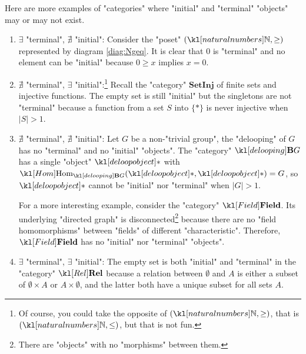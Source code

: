 \documentclass[main.tex]{subfiles}
\begin{document}
\begin{exmps}
	Here are more examples of "categories" where "initial" and "terminal" "objects" may or may not exist.
	\begin{enumerate}
		\begin{marginfigure}[3\baselineskip]
			\begin{equation}\label{diag:Ngeq}
				\begin{tikzcd}
				\stackrel{0}{\bullet}  & \arrow[l] \stackrel{1}{\bullet}  & \arrow[l] \stackrel{2}{\bullet}  & \arrow[l] \cdots
				\end{tikzcd}
			\end{equation}
		\end{marginfigure}
		\item $\exists$ "terminal", $\nexists$ "initial": Consider the "poset" $(\N, \geq)$ represented by diagram \eqref{diag:Ngeq}. It is clear that $0$ is "terminal" and no element can be "initial" because $0 \geq x$ implies $x = 0$.
		
		\item %
		$\nexists$ "terminal", $\exists$ "initial":\footnote{Of course, you could take the opposite of $(\N, \geq)$, that is $(\N, \leq)$, but that is not fun.} Recall the "category" $\mathbf{SetInj}$ of finite sets and injective functions. The empty set is still "initial" but the singletons are not "terminal" because a function from a set $S$ into $\{\ast\}$ is never injective when $|S| > 1$.
		\item $\nexists$ "terminal", $\nexists$ "initial": Let $G$ be a non-"trivial group", the "delooping" of $G$ has no "terminal" and no "initial" "objects". The "category" $\deloop{G}$ has a single "object" $\deloopobject$ with $\Hom_{\deloop{G}}(\deloopobject, \deloopobject) = G$, so $\deloopobject$ cannot be "initial" nor "terminal" when $|G| > 1$.
		
		For a more interesting example, consider the "category" $\catField$. Its underlying "directed graph" is disconnected\footnote{There are "objects" with no "morphisms" between them.} because there are no "field homomorphisms" between "fields" of different "characteristic". Therefore, $\catField$ has no "initial" nor "terminal" "objects".
		\item $\exists$ "terminal", $\exists$ "initial": The empty set is both "initial" and "terminal" in the "category" $\catRel$ because a relation between $\emptyset$ and $A$ is either a subset of $\emptyset \times A$ or $A \times \emptyset$, and the latter both have a unique subset for all sets $A$.
		

\end{enumerate}
\end{exmps}
\end{document}
